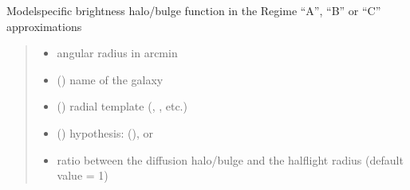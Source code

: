 \documentclass[letterpaper,10pt,english]{sphinxmanual}
\begin{document}
\begin{fulllineitems}
\label{\detokenize{diffsph.profiles:diffsph.profiles.massmodels.Hbr}}
\pysigstartsignatures
{}
\pysigstopsignatures
\sphinxAtStartPar
Model\sphinxhyphen{}specific brightness halo/bulge function in the Regime “A”, “B” or “C” approximations
\begin{quote}\begin{description}
\begin{itemize}
\item {} 
\sphinxAtStartPar
{} \textendash{} angular radius in arcmin

\item {} 
\sphinxAtStartPar
{} () \textendash{} name of the galaxy

\item {} 
\sphinxAtStartPar
{} () \textendash{} radial template (, , etc.)

\item {} 
\sphinxAtStartPar
{} () \textendash{} hypothesis:  (),  or 

\item {} 
\sphinxAtStartPar
{} \textendash{} ratio between the diffusion halo/bulge and the half\sphinxhyphen{}light radius (default value = 1)


\end{itemize}
\end{description}
\end{quote}
\end{fulllineitems}
\end{document}
